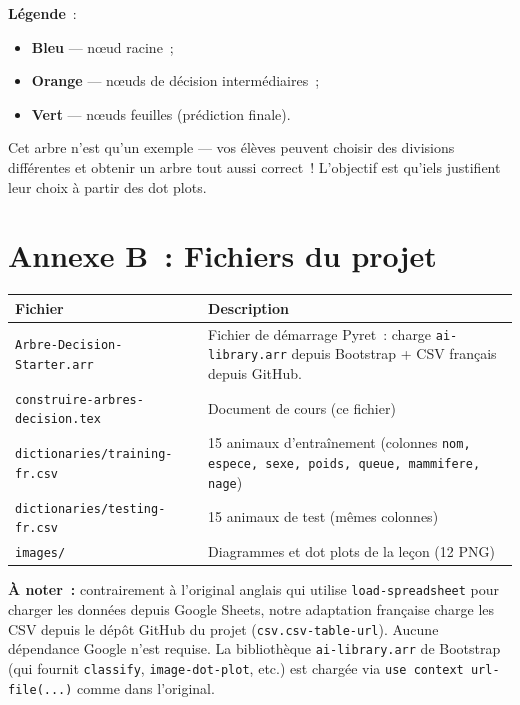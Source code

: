 \documentclass[12pt,a4paper]{article}
\begin{document}
\vspace{1em}
\textbf{Légende}~:
\begin{itemize}
  \item \textcolor{rootblue}{\textbf{Bleu}} — nœud racine~;
  \item \textcolor{nodeorange!80!black}{\textbf{Orange}} — nœuds de décision intermédiaires~;
  \item \textcolor{leafgreen!70!black}{\textbf{Vert}} — nœuds feuilles (prédiction finale).
\end{itemize}

\begin{instructornotes}
  Cet arbre n'est qu'un exemple — vos élèves peuvent choisir des divisions différentes et obtenir un arbre tout aussi correct~! L'objectif est qu'iels justifient leur choix à partir des dot plots.
\end{instructornotes}

\section*{Annexe B~: Fichiers du projet}

\begin{center}
\begin{tabularx}{\textwidth}{l X}
  \toprule
  \textbf{Fichier} & \textbf{Description} \\
  \midrule
  \texttt{Arbre\allowbreak-Decision\allowbreak-Starter.arr} & Fichier de démarrage Pyret~: charge \texttt{ai-library.arr} depuis Bootstrap + CSV français depuis GitHub. \\
  \texttt{construire-arbres-decision.tex} & Document de cours (ce fichier) \\
  \texttt{dictionaries/training-fr.csv} & 15 animaux d'entraînement (colonnes \texttt{nom, espece, sexe, poids, queue, mammifere, nage}) \\
  \texttt{dictionaries/testing-fr.csv}  & 15 animaux de test (mêmes colonnes) \\
  \texttt{images/} & Diagrammes et dot plots de la leçon (12 PNG) \\
  \bottomrule
\end{tabularx}
\end{center}

\vspace{1em}
\textbf{À noter~:} contrairement à l'original anglais qui utilise \texttt{load-spreadsheet} pour charger les données depuis Google Sheets, notre adaptation française charge les CSV depuis le dépôt GitHub du projet (\texttt{csv.csv-table-url}). Aucune dépendance Google n'est requise. La bibliothèque \texttt{ai-library.arr} de Bootstrap (qui fournit \texttt{classify}, \texttt{image-dot-plot}, etc.) est chargée via \texttt{use context url-file(...)} comme dans l'original.
\end{document}
